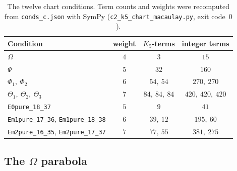 \documentclass[a4paper,11pt]{article}
\let\jsOldToprule\toprule
\renewcommand{\toprule}{\jsOldToprule\rowcolor{bgheader}}
\theoremstyle{jsplain}
\theoremstyle{jsdef}
\theoremstyle{jsrem}
\begin{document}
\begin{table}[htbp]
\centering
\begin{tabular}{lccc}
\toprule
Condition & weight & $K_5$-terms & integer terms \\
\midrule
$\Omega$ & $4$ & $3$ & $15$ \\
$\Psi$ & $5$ & $32$ & $160$ \\
$\Phi_1,\ \Phi_2$ & $6$ & $54,\ 54$ & $270,\ 270$ \\
$\Theta_1,\ \Theta_2,\ \Theta_3$ & $7$ & $84,\ 84,\ 84$ & $420,\ 420,\ 420$ \\
\texttt{E0pure\_\allowbreak{}18\_\allowbreak{}37} & $5$ & $9$ & $41$ \\
\texttt{Em1pure\_\allowbreak{}17\_\allowbreak{}36}, \texttt{Em1pure\_\allowbreak{}18\_\allowbreak{}38} & $6$ & $39,\ 12$ & $195,\ 60$ \\
\texttt{Em2pure\_\allowbreak{}16\_\allowbreak{}35}, \texttt{Em2pure\_\allowbreak{}17\_\allowbreak{}37} & $7$ & $77,\ 55$ & $381,\ 275$ \\
\bottomrule
\end{tabular}
\caption{The twelve chart conditions. Term counts and weights were recomputed from \texttt{conds\_\allowbreak{}c.\allowbreak{}json} with SymPy (\texttt{c2\_\allowbreak{}k5\_\allowbreak{}chart\_\allowbreak{}macaulay.\allowbreak{}py}, exit code~$0$).}
\label{bc:tab:conds}
\end{table}

\subsection{\texorpdfstring{The $\Omega$ parabola}{The Omega parabola}}\label{bc:sec:omega}
\end{document}
